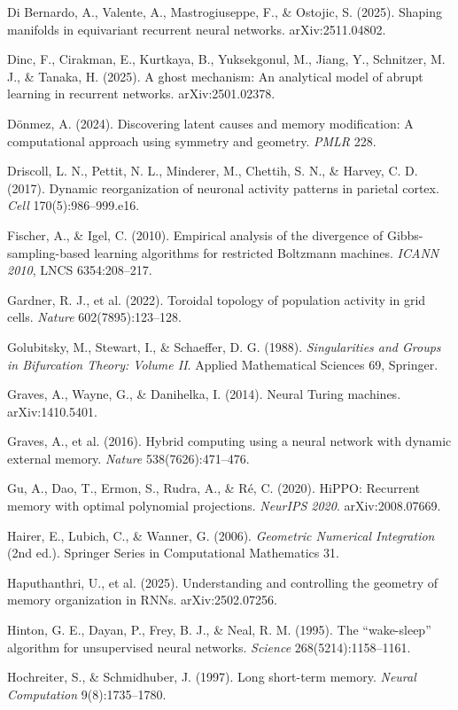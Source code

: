 \documentclass{article}
\begin{document}
Di Bernardo, A., Valente, A., Mastrogiuseppe, F., \& Ostojic, S. (2025). Shaping manifolds in equivariant recurrent neural networks. arXiv:2511.04802.

Dinc, F., Cirakman, E., Kurtkaya, B., Yuksekgonul, M., Jiang, Y., Schnitzer, M. J., \& Tanaka, H. (2025). A ghost mechanism: An analytical model of abrupt learning in recurrent networks. arXiv:2501.02378.

D\"onmez, A. (2024). Discovering latent causes and memory modification: A computational approach using symmetry and geometry. \emph{PMLR} 228.

Driscoll, L. N., Pettit, N. L., Minderer, M., Chettih, S. N., \& Harvey, C. D. (2017). Dynamic reorganization of neuronal activity patterns in parietal cortex. \emph{Cell} 170(5):986--999.e16.

Fischer, A., \& Igel, C. (2010). Empirical analysis of the divergence of Gibbs-sampling-based learning algorithms for restricted Boltzmann machines. \emph{ICANN 2010}, LNCS 6354:208--217.

Gardner, R. J., et al. (2022). Toroidal topology of population activity in grid cells. \emph{Nature} 602(7895):123--128.

Golubitsky, M., Stewart, I., \& Schaeffer, D. G. (1988). \emph{Singularities and Groups in Bifurcation Theory: Volume II}. Applied Mathematical Sciences 69, Springer.

Graves, A., Wayne, G., \& Danihelka, I. (2014). Neural Turing machines. arXiv:1410.5401.

Graves, A., et al. (2016). Hybrid computing using a neural network with dynamic external memory. \emph{Nature} 538(7626):471--476.

Gu, A., Dao, T., Ermon, S., Rudra, A., \& R\'e, C. (2020). HiPPO: Recurrent memory with optimal polynomial projections. \emph{NeurIPS 2020}. arXiv:2008.07669.

Hairer, E., Lubich, C., \& Wanner, G. (2006). \emph{Geometric Numerical Integration} (2nd ed.). Springer Series in Computational Mathematics 31.

Haputhanthri, U., et al. (2025). Understanding and controlling the geometry of memory organization in RNNs. arXiv:2502.07256.

Hinton, G. E., Dayan, P., Frey, B. J., \& Neal, R. M. (1995). The ``wake-sleep'' algorithm for unsupervised neural networks. \emph{Science} 268(5214):1158--1161.

Hochreiter, S., \& Schmidhuber, J. (1997). Long short-term memory. \emph{Neural Computation} 9(8):1735--1780.
\end{document}
